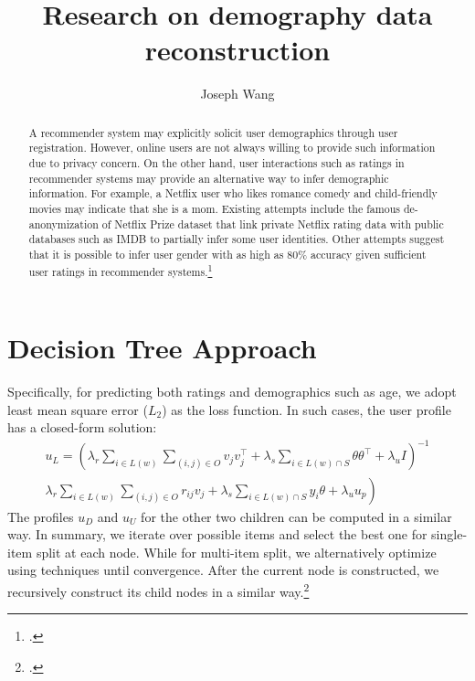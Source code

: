\documentclass[nosupp]{cup-ino}
\title{Research on demography data reconstruction}
\author{Joseph Wang}
\begin{document}
\maketitle

\begin{abstract}
A recommender system may explicitly solicit user demographics through user registration. However, online users are not always willing to provide such information due to privacy concern. On the other hand, user interactions such as ratings in recommender systems may provide an alternative way to infer demographic information. For example, a Netflix user who likes romance comedy and child-friendly movies may indicate that she is a mom. Existing attempts include the famous de-anonymization of Netflix Prize dataset that link private Netflix rating data with public databases such as IMDB to partially infer some user identities. Other attempts suggest that it is possible to infer user gender
with as high as 80\% accuracy given sufficient user ratings in recommender systems.\footcite{Li:2017}
\end{abstract}


\section{Decision Tree Approach}
Specifically, for predicting both ratings and demographics such as age, we adopt least mean square error ($L_{2}$) as the loss function. In such cases, the user profile has a closed-form solution:
\begin{equation}
\begin{array}{c}
u_{L}=\left(\lambda_{r} \sum_{i \in L(w)} \sum_{(i, j) \in O} v_{j} v_{j}^{\top}+\lambda_{s} \sum_{i \in L(w) \cap S} \theta \theta^{\top}+\lambda_{u} I\right)^{-1} \\
\left.\lambda_{r} \sum_{i \in L(w)} \sum_{(i, j) \in O} r_{i j} v_{j}+\lambda_{s} \sum_{i \in L(w) \cap S} y_{i} \theta+\lambda_{u} u_{p}\right)
\end{array}
\end{equation}
The profiles $u_{D}$ and $u_{U}$ for the other two children can be computed in a similar way. In summary, we iterate over possible items and select the best one for single-item split at each node. While for multi-item split, we alternatively optimize using techniques until convergence. After the current node is constructed, we recursively construct its child nodes in a similar way.\footcite{Sun:2017}
\end{document}

